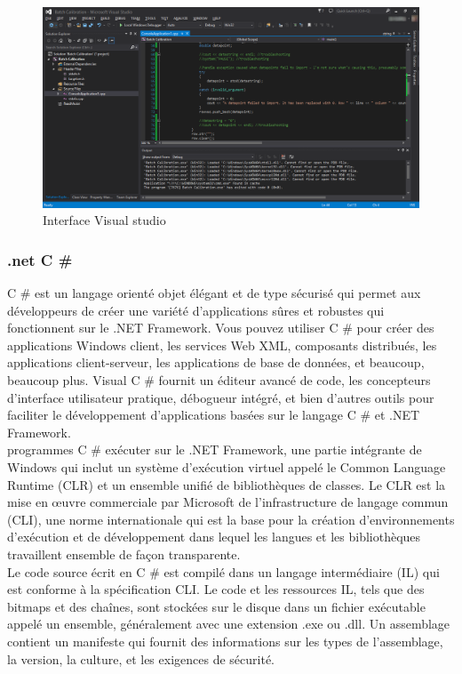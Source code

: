 \documentclass[11pt, a4paper, twoside]{book}
\begin{document}
\begin{figure}[H]
\centering
\includegraphics[width=\textwidth]{vs}
\caption{Interface Visual studio }
\end{figure}

\subsubsection{.net C \#}
C \# est un langage orienté objet élégant et de type sécurisé qui permet aux développeurs de créer une variété d'applications sûres et robustes qui fonctionnent sur le .NET Framework. Vous pouvez utiliser C \# pour créer des applications Windows client, les services Web XML, composants distribués, les applications client-serveur, les applications de base de données, et beaucoup, beaucoup plus. Visual C \# fournit un éditeur avancé de code, les concepteurs d'interface utilisateur pratique, débogueur intégré, et bien d'autres outils pour faciliter le développement d'applications basées sur le langage C \# et .NET Framework.\\

programmes C \# exécuter sur le .NET Framework, une partie intégrante de Windows qui inclut un système d'exécution virtuel appelé le Common Language Runtime (CLR) et un ensemble unifié de bibliothèques de classes. Le CLR est la mise en œuvre commerciale par Microsoft de l'infrastructure de langage commun (CLI), une norme internationale qui est la base pour la création d'environnements d'exécution et de développement dans lequel les langues et les bibliothèques travaillent ensemble de façon transparente.\\

Le code source écrit en C \# est compilé dans un langage intermédiaire (IL) qui est conforme à la spécification CLI. Le code et les ressources IL, tels que des bitmaps et des chaînes, sont stockées sur le disque dans un fichier exécutable appelé un ensemble, généralement avec une extension .exe ou .dll. Un assemblage contient un manifeste qui fournit des informations sur les types de l'assemblage, la version, la culture, et les exigences de sécurité.\\
\end{document}
